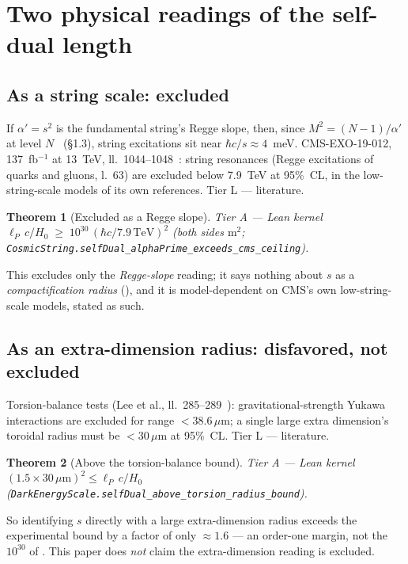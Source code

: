 \documentclass[11pt,a4paper]{article}
\newtheorem{theorem}{Theorem}[section]
\theoremstyle{remark}
\newcommand{\tierA}{\colorbox{green!15}{\textsf{\scriptsize Tier A --- Lean kernel}}}
\newcommand{\tierL}{\colorbox{blue!10}{\textsf{\scriptsize Tier L --- literature}}}
\begin{document}
\section{Two physical readings of the self-dual length}
\label{sec:readings}

\subsection{As a string scale: excluded}
\label{sec:strings-scale}
If $\alpha'=s^2$ is the fundamental string's Regge slope, then, since $M^2=(N-1)/\alpha'$ at
level $N$~\cite{Tong2009} (§1.3), string excitations sit near $\hbar c/s\approx4$~meV. CMS-EXO-19-012,
137~fb$^{-1}$ at 13~TeV, ll.~1044--1048~\cite{CMS2020}: string resonances (Regge excitations of
quarks and gluons, l.~63) are excluded below 7.9~TeV at 95\%~CL, in the low-string-scale models of
its own references. \tierL.

\begin{theorem}[Excluded as a Regge slope] \label{thm:regge} \tierA\
$\ell_P\,c/H_0\;\ge\;10^{30}\,(\hbar c/7.9\,\mathrm{TeV})^2$ \textnormal{(both sides
$\mathrm{m}^2$; \texttt{CosmicString.selfDual\_alphaPrime\_exceeds\_cms\_ceiling}}\textnormal{)}.
\end{theorem}
This excludes only the \emph{Regge-slope} reading; it says nothing about $s$ as a
\emph{compactification radius} (\Cref{sec:strings-radius}), and it is model-dependent on CMS's own
low-string-scale models, stated as such.

\subsection{As an extra-dimension radius: disfavored, not excluded}
\label{sec:strings-radius}
Torsion-balance tests (Lee et al., ll.~285--289~\cite{LeeAdelberger2020}): gravitational-strength
Yukawa interactions are excluded for range $<38.6\,\mu$m; a single large extra dimension's toroidal
radius must be $<30\,\mu$m at 95\%~CL. \tierL.

\begin{theorem}[Above the torsion-balance bound] \label{thm:torsion} \tierA\
$(1.5\times30\,\mu\mathrm{m})^2\le\ell_P\,c/H_0$ \textnormal{(}\texttt{DarkEnergyScale.selfDual\_above\_torsion\_radius\_bound}\textnormal{)}.
\end{theorem}
So identifying $s$ directly with a large extra-dimension radius exceeds the experimental bound by a
factor of only $\approx1.6$ --- an order-one margin, not the $10^{30}$ of . This
paper does \emph{not} claim the extra-dimension reading is excluded.
\end{document}
